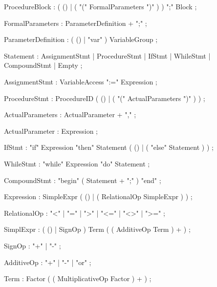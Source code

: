 \begin{rail}
ProcedureBlock : ( () | ( "(" FormalParameters ")" ) ) ";" Block ;
\end{rail}
\begin{rail}
FormalParameters : ParameterDefinition + ";" ;
\end{rail}
\begin{rail}
ParameterDefinition : ( () | "var" ) VariableGroup ;
\end{rail}
\begin{rail}
Statement : AssignmentStmt | ProcedureStmt | IfStmt | WhileStmt |
CompoundStmt | Empty ;
\end{rail}
\begin{rail}
AssignmentStmt : VariableAccess ":=" Expression ;
\end{rail}
\begin{rail}
ProcedureStmt : ProcedureID ( () | ( "(" ActualParameters ")" ) ) ;
\end{rail}
\begin{rail}
ActualParameters : ActualParameter + "," ;
\end{rail}
\begin{rail}
ActualParameter : Expression ;
\end{rail}
\begin{rail}
IfStmt : "if" Expression "then" Statement ( () | ( "else" Statement ) ) ;
\end{rail}
\begin{rail}
WhileStmt : "while" Expression "do" Statement ;
\end{rail}
\begin{rail}
CompoundStmt : "begin" ( Statement + ";" ) "end" ;
\end{rail}
\begin{rail}
Expression : SimpleExpr ( () | ( RelationalOp SimpleExpr ) ) ;
\end{rail}
\begin{rail}
RelationalOp : "<" | "=" | ">" | "<=" | "<>" | ">=" ;
\end{rail}
\begin{rail}
SimplExpr : ( () | SignOp ) Term ( ( AdditiveOp Term ) + ) ;
\end{rail}
\begin{rail}
SignOp : "+" | "-" ;
\end{rail}
\begin{rail}
AdditiveOp : "+" | "-" | "or" ;
\end{rail}
\begin{rail}
Term : Factor ( ( MultiplicativeOp Factor ) + ) ;
\end{rail}
